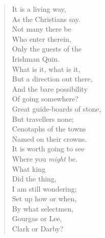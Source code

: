 \documentclass[twoside,openright,10pt]{memoir} %
\begin{document}
\begin{verse}
\hspace{2em}It is a living way, \\
\hspace{2em}As the Christians say. \\
\hspace{0em}Not many there be \\
\hspace{1em}Who enter therein, \\
\hspace{0em}Only the guests of the \\
\hspace{1em}Irishman Quin. \\
\hspace{0em}What is it, what is it, \\
\hspace{1em}But a direction out there, \\
\hspace{0em}And the bare possibility \\
\hspace{1em}Of going somewhere? \\
\hspace{2em}Great guide-boards of stone, \\
\hspace{2em}But travellers none; \\
\hspace{2em}Cenotaphs of the towns \\
\hspace{2em}Named on their crowns. \\
\hspace{2em}It is worth going to see \\
\hspace{2em}Where you \emph{might} be. \\
\hspace{2em}What king \\
\hspace{2em}Did the thing, \\
\hspace{2em}I am still wondering; \\
\hspace{2em}Set up how or when, \\
\hspace{2em}By what selectmen, \\
\hspace{2em}Gourgas or Lee, \\
\hspace{2em}Clark or Darby? \\

\end{verse}
\end{document}
